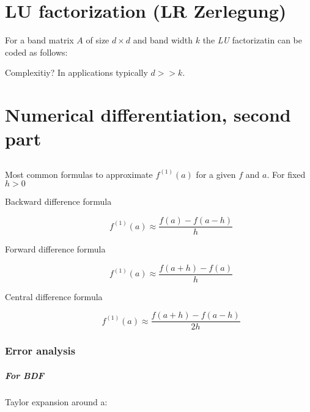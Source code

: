\chapter{LU factorization (LR Zerlegung)}

For a band matrix $A$ of size $d \times d$ and band width $k$ the \textit{LU}
factorizatin can be coded as follows:


Complexitiy? In applications typically $d >> k$.

\chapter{Numerical differentiation, second part}

\section{}
Most common formulas to approximate $f^{(1)}(a)$ for a given $f$ and 
$a$. For fixed $h > 0$

\begin{description}
	\item[Backward difference formula]
		\[f^{(1)}(a) \approx \frac{f(a) - f(a-h)}{h}\]
	\item[Forward difference formula]
		\[f^{(1)}(a) \approx \frac{f(a + h) - f(a)}{h}\]
	\item[Central difference formula]
		\[f^{(1)}(a) \approx \frac{f(a + h) - f(a - h)}{2h}\]
\end{description}

\subsection{Error analysis}

\paragraph{For BDF}
Taylor expansion around a:

